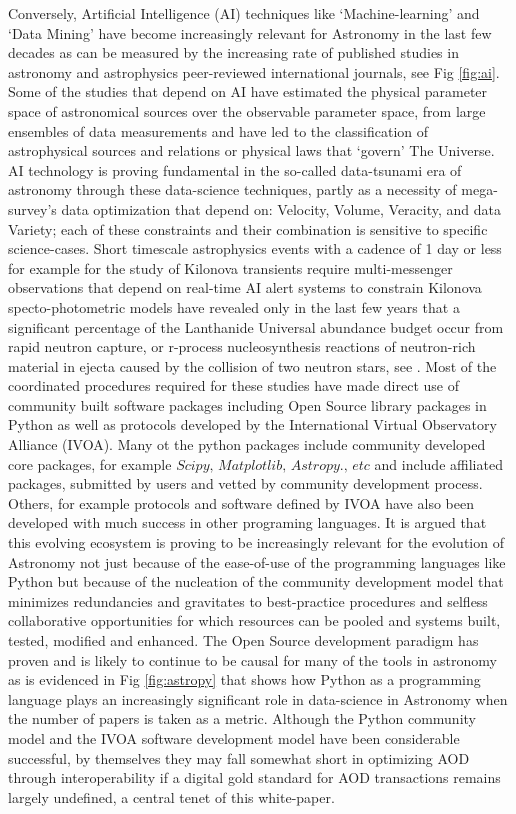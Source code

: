 \documentclass[final,5p,times,twocolumn,authoryear]{elsarticle}
\begin{document}
Conversely, Artificial Intelligence (AI) techniques like `Machine-learning' and `Data Mining'  have become increasingly relevant for Astronomy in the last few decades as can be measured by the increasing rate of published studies in astronomy and astrophysics peer-reviewed international journals, see Fig \ref{fig:ai}. Some of the studies that depend on AI have estimated the physical parameter space of astronomical sources over the observable parameter space, from large ensembles of data measurements and have led to the classification of astrophysical sources and relations or physical laws that `govern' The Universe. AI technology is proving fundamental in the so-called data-tsunami era of astronomy through these data-science techniques, partly as a necessity of mega-survey's data optimization that depend on: Velocity, Volume, Veracity, and data Variety; each of these constraints and their combination is sensitive to specific science-cases. Short timescale astrophysics events with a cadence of 1 day or less for example for the study of Kilonova transients require multi-messenger observations that depend on real-time AI alert systems to constrain Kilonova specto-photometric models have revealed only in the last few years that a significant percentage of the Lanthanide Universal abundance budget occur from rapid neutron capture, or r-process nucleosynthesis reactions of neutron-rich material in 
 ejecta caused by the collision of two neutron stars, see \cite{artola2020}. Most of the coordinated procedures required for these studies have made direct use of community built software packages including Open Source library packages in Python as well as protocols developed by the International Virtual Observatory Alliance (IVOA). Many ot the python packages include community developed core packages, for example $\textit{Scipy, Matplotlib, Astropy., etc}$  and include affiliated packages, submitted by users and vetted by community development process. Others, for example protocols and software defined by IVOA have also been developed with much success in other programing languages. It is argued that this evolving ecosystem is proving to be increasingly relevant for the evolution of Astronomy not just because of the ease-of-use of the programming languages like Python but because of the nucleation of the community development model that minimizes redundancies and gravitates to best-practice procedures and selfless collaborative opportunities for which resources can be pooled and systems built, tested, modified and enhanced. The Open Source development paradigm has proven and is likely to continue to be causal for many of the tools in astronomy as is evidenced in Fig \ref{fig:astropy} that shows how Python as a programming language plays an increasingly significant role in data-science in Astronomy when the number of papers is taken as a metric.  Although the Python community model and the IVOA software development model have been considerable successful, by themselves they may fall somewhat short in optimizing AOD through interoperability if a digital gold standard for AOD transactions remains largely undefined, a central tenet of this white-paper.
\end{document}
